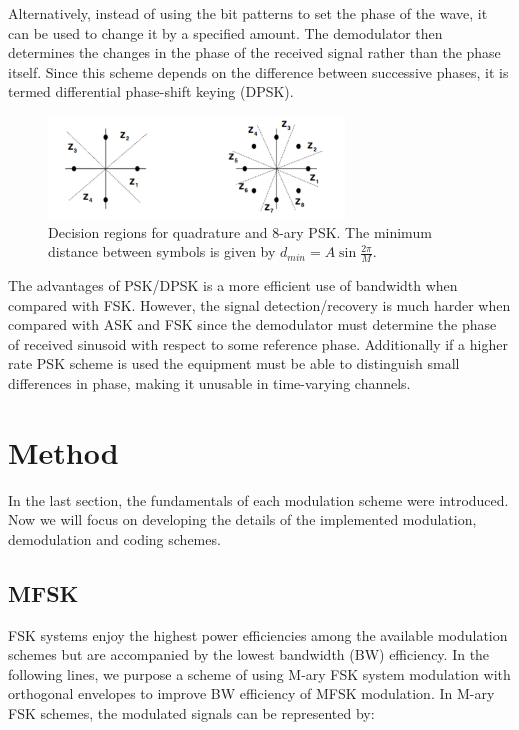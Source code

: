 \documentclass[12pt,a4paper,openright]{article}
\begin{document}
 Alternatively, instead of using the bit patterns to set the phase of the wave, it can be used to change it by a specified amount. The demodulator then determines the changes in the phase of the received signal rather than the phase itself. Since this scheme depends on the difference between successive phases, it is termed differential phase-shift keying (DPSK). 
 \begin{figure}[h]
  \centering
    \includegraphics[width=0.7\textwidth]{PSKmodulation.pdf}
    \caption{Decision regions for quadrature and 8-ary PSK. The minimum distance between symbols is given by $d_{min}=A\sin\frac{2\pi}{M}$.}
    \label{pskdr}
\end{figure}

The advantages of PSK/DPSK is a more efficient use of bandwidth when compared with FSK. However, the signal detection/recovery is much harder when compared with ASK and FSK since the demodulator must determine the phase of received sinusoid with respect to some reference phase. Additionally if a higher rate PSK scheme is used the equipment must be able to distinguish small differences in phase, making it unusable in time-varying channels. 


\section{Method}

In the last section, the fundamentals of each modulation scheme were introduced. Now we will focus on developing the details of the implemented modulation, demodulation and coding schemes. 

\subsection{MFSK}

FSK systems enjoy the highest power efficiencies among the available modulation schemes but are accompanied by the lowest bandwidth (BW) efficiency. In the following lines, we purpose a scheme of using M-ary FSK system modulation with orthogonal envelopes to improve BW efficiency of MFSK modulation. In M-ary FSK schemes, the modulated signals can be represented by:
\end{document}
